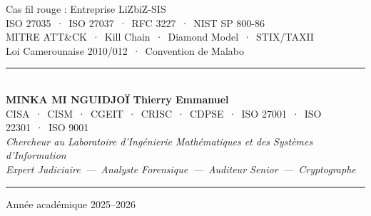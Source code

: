 \documentclass[12pt, a4paper, twoside, openright]{book}
\begin{document}
\begin{titlepage}
\vspace{1.8cm}

\begin{center}
    {\color{white!70!gray}\small
        \quad Cas fil rouge : Entreprise LiZbiZ-SIS}\\[0.5ex]
    {\color{white!70!gray}\small
        \quad ISO 27035~·~ISO 27037~·~RFC 3227~·~NIST SP 800-86}\\[0.5ex]
    {\color{white!70!gray}\small
        \quad MITRE ATT\&CK~·~Kill Chain~·~Diamond Model~·~STIX/TAXII}\\[0.5ex]
    {\color{white!70!gray}\small
        \quad Loi Camerounaise 2010/012~·~Convention de Malabo}
\end{center}

\vfill

\begin{center}
    {\color{CouleurAccent}\rule{0.7\linewidth}{1.2pt}}\\[1.2ex]
    {\color{white}\large\bfseries MINKA MI NGUIDJOÏ Thierry Emmanuel}\\[0.4ex]
    {\color{white!80!gray}\small
        CISA~·~CISM~·~CGEIT~·~CRISC~·~CDPSE~·~ISO 27001~·~ISO 22301~·~ISO 9001}\\[0.3ex]
    {\color{white!70!gray}\footnotesize\itshape
        Chercheur au Laboratoire d'Ingénierie Mathématiques et des Systèmes d'Information}\\[0.3ex]
    {\color{white!70!gray}\footnotesize\itshape
        Expert Judiciaire~—~Analyste Forensique~—~Auditeur Senior~—~Cryptographe}\\[1.2ex]
    {\color{CouleurAccent}\rule{0.7\linewidth}{1.2pt}}
\end{center}

\vspace{0.6cm}

\begin{center}
    {\color{white!60!gray}\small Année académique 2025--2026}
\end{center}

\afterpage{\nopagecolor}
\end{titlepage}


\clearpage
\thispagestyle{empty}
\vspace*{\fill}
\end{document}
